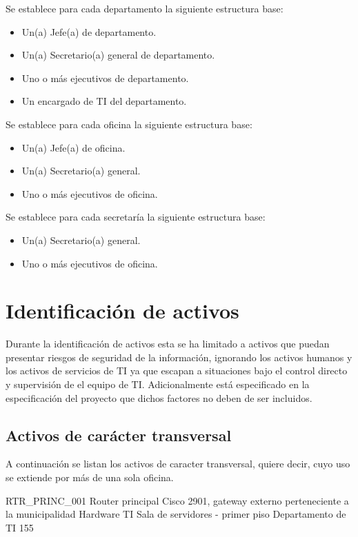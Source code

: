 \documentclass[11pt]{utalcaDoc}
\begin{document}
Se establece para cada departamento la siguiente estructura base:
\begin{itemize}
	\item Un(a) Jefe(a) de departamento.
	\item Un(a) Secretario(a) general de departamento.
	\item Uno o más ejecutivos de departamento.
	\item Un encargado de TI del departamento.
\end{itemize}


Se establece para cada oficina la siguiente estructura base:
\begin{itemize}
	\item Un(a) Jefe(a) de oficina.
	\item Un(a) Secretario(a) general.
	\item Uno o más ejecutivos de oficina.
\end{itemize}

Se establece para cada secretaría la siguiente estructura base:
\begin{itemize}
	\item Un(a) Secretario(a) general.
	\item Uno o más ejecutivos de oficina.
\end{itemize}

\section{Identificación de activos}
Durante la identificación de activos esta se ha limitado a activos que puedan presentar riesgos de seguridad de la información, ignorando los activos humanos y los activos de servicios de TI ya que escapan a situaciones bajo el control directo y supervisión de el equipo de TI. Adicionalmente está especificado en la especificación del proyecto que dichos factores no deben de ser incluidos.

\subsection{Activos de carácter transversal}
A continuación se listan los activos de caracter transversal, quiere decir, cuyo uso se extiende por más de una sola oficina.

\informationResource
{RTR\_PRINC\_001}
{Router principal Cisco 2901, gateway externo perteneciente a la municipalidad}
{Hardware TI}
{Sala de servidores - primer piso}
{Departamento de TI}
{1}{5}{5}
{
	\threatResourceLost
	\threatHumanIntervention
	\threatRemoteIntervention
	\threatNaturalDisaster
	\threatHumanDisaster
}
\end{document}
